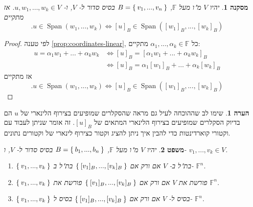 \documentclass[12pt]{report}
\theoremstyle{plain}
\newtheorem{theorem}{משפט}[chapter]
\newtheorem{corollary}[theorem]{מסקנה}
\theoremstyle{definition}
\newtheorem{remark}{הערה}[chapter]
\newcommand{\F}{\mathbb{F}}
\newcommand{\0}{\mathbf{0}}
\DeclareMathOperator{\Span}{Span}
\begin{document}
\begin{corollary}\label{cor:span-coordinates}
יהיו
$V$
מ"ו מעל
$\F$,
$B=\Set{v_1,...,v_n}$
בסיס סדור ל-
$V$,
ו-
$u,w_1,...,w_k\in V$.
אז מתקיים
$$
.u\in\Span(w_1,...,w_k) \iff [u]_B\in\Span([w_1]_B,...,[w_k]_B)
$$
\end{corollary}

\begin{proof}
לפי טענה
\ref{prop:coordinates-linear},
כל
$\alpha_1,...,\alpha_k\in\F$
מתקיים:
$$
\begin{aligned}
u=\alpha_1w_1+...+\alpha_kw_k &\iff [u]_B=[\alpha_1w_1+...+\alpha_kw_k]_B \\
&\iff [u]_B=\alpha_1[w_1]_B+...+\alpha_k[w_k]_B
\end{aligned}
$$
אז מתקיים
$$
.u\in\Span(w_1,...,w_k) \iff [u]_B\in\Span([w_1]_B,...,[w_k]_B)
$$
\end{proof}

\begin{remark}
שימו לב שההוכחה לעיל גם מראה שהסקלרים שמופיעים בצירוף הלינארי של
$u$
הם בדיוק הסקלרים שמופיעים בצירוף הלינארי המתאים של
$[u]_B$.
זה אומר שניתן לעבוד עם וקטורי קוארדינטות כדי להבין איך ניתן להציג וקטור כצירוף לינארי של וקטורים נתונים.
\end{remark}

\begin{theorem}\label{thm:test-by-coordinates}
יהיו
$V$
מ"ו מעל
$\F$,
$B=\Set{b_1,...,b_n}$
בסיס סדור ל-
$V$,
ו-
$v_1,...,v_k\in V$.
\begin{enumerate}[label=\alph*.]
\item
$\Set{v_1,...,v_k}$
בת"ל ב-
$V$
אם ורק אם
$\Set{[v_1]_B,...,[v_k]_B}$
בת"ל ב-
$\F^n$.


\item 
$\Set{v_1,...,v_k}$
פורשת את
$V$
אם ורק אם
$\Set{[v_1]_B,...,[v_k]_B}$
פורשת את
$\F^n$.


\item 
$\Set{v_1,...,v_k}$
בסיס ל-
$V$
אם ורק אם
$\Set{[v_1]_B,...,[v_k]_B}$
בסיס ל-
$\F^n$.


\end{enumerate}
\end{theorem}
\end{document}
